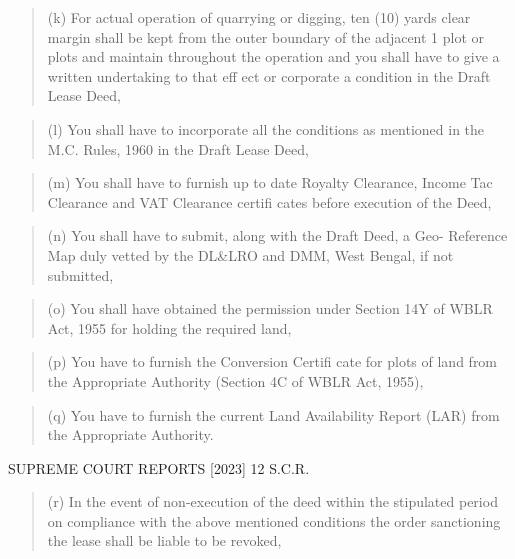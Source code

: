 \documentclass[12pt,a4paper]{article}
\newenvironment{judgequote}
  {\begin{quote}\small}
  {\end{quote}}
\begin{document}
\begin{judgequote}
(k) For actual operation of quarrying or digging, ten (10) yards clear
margin shall be kept from the outer boundary of the adjacent 1 plot
or plots and maintain throughout the operation and you shall have to
give a written undertaking to that eff ect or corporate a condition in
the Draft Lease Deed,
\end{judgequote}

\begin{judgequote}
(l) You shall have to incorporate all the conditions as mentioned in
the M.C. Rules, 1960 in the Draft Lease Deed,
\end{judgequote}

\begin{judgequote}
(m) You shall have to furnish up to date Royalty Clearance, Income Tac
Clearance and VAT Clearance certifi cates before execution of the Deed,
\end{judgequote}

\begin{judgequote}
(n) You shall have to submit, along with the Draft Deed, a Geo-
Reference Map duly vetted by the DL\&LRO and DMM, West Bengal,
if not submitted,
\end{judgequote}

\begin{judgequote}
(o) You shall have obtained the permission under Section 14Y of
WBLR Act, 1955 for holding the required land,
\end{judgequote}

\begin{judgequote}
(p) You have to furnish the Conversion Certifi cate for plots of land
from the Appropriate Authority (Section 4C of WBLR Act, 1955),
\end{judgequote}

\begin{judgequote}
(q) You have to furnish the current Land Availability Report (LAR)
from the Appropriate Authority.
\end{judgequote}



 SUPREME COURT REPORTS [2023] 12 S.C.R.


\begin{judgequote}
(r) In the event of non-execution of the deed within the stipulated
period on compliance with the above mentioned conditions the order
sanctioning the lease shall be liable to be revoked,
\end{judgequote}
\end{document}
